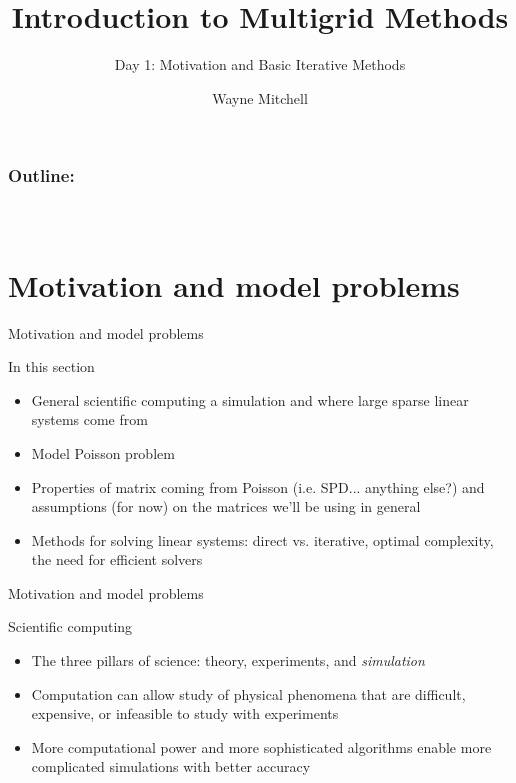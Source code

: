 \documentclass[18pt,xcolor=table]{beamer}
\title[Multigrid]{Introduction to Multigrid Methods}
\subtitle{Day 1: Motivation and Basic Iterative Methods}
\author[Mitchell]{Wayne Mitchell}
\institute{\pgfuseimage{logo}\\Universit\"at Heidelberg\\Institut f\"ur Technische Informatik}
\date[]{\alert{}}
\begin{document}


\DeclareRobustCommand{\Chi}{\raisebox{2pt}{$\chi$}}

\begin{frame}
\frametitle{\bf Outline:}
\framesubtitle{~~}
\tableofcontents
\end{frame}


\section{Motivation and model problems}

\begin{frame}{Motivation and model problems}
\begin{block}{In this section}
\begin{itemize}
\item General scientific computing a simulation and where large sparse linear systems come from
\item Model Poisson problem
\item Properties of matrix coming from Poisson (i.e. SPD... anything else?) and assumptions (for now) on the matrices we'll be using in general
\item Methods for solving linear systems: direct vs. iterative, optimal complexity, the need for efficient solvers
\end{itemize}
\end{block}

\end{frame}

\begin{frame}{Motivation and model problems}
\begin{block}{Scientific computing}
\begin{itemize}
\item The three pillars of science: theory, experiments, and \emph{simulation}
\item Computation can allow study of physical phenomena that are difficult, expensive, or infeasible to study with experiments
\item More computational power and more sophisticated algorithms enable more complicated simulations with better accuracy
\end{itemize}
\end{block}

\end{frame}
\end{document}
